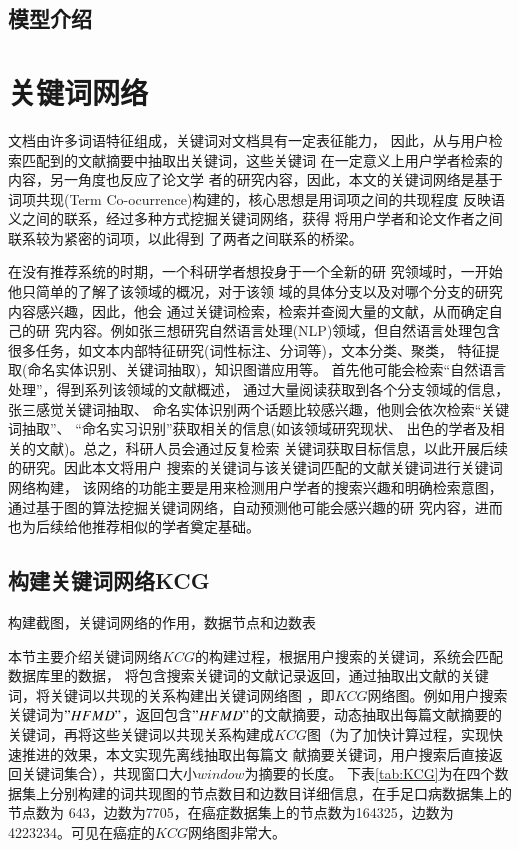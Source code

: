 \subsection{模型介绍}



\section{关键词网络}
文档由许多词语特征组成，关键词对文档具有一定表征能力，%
因此，从与用户检索匹配到的文献摘要中抽取出关键词，这些关键词%
在一定意义上用户学者检索的内容，另一角度也反应了论文学%
者的研究内容，因此，本文的关键词网络是基于词项共现(Term Co-ocurrence)构建的，核心思想是用词项之间的共现程度%
反映语义之间的联系，经过多种方式挖掘关键词网络，获得%
将用户学者和论文作者之间联系较为紧密的词项，以此得到%
了两者之间联系的桥梁。

在没有推荐系统的时期，一个科研学者想投身于一个全新的研%
究领域时，一开始他只简单的了解了该领域的概况，对于该领%
域的具体分支以及对哪个分支的研究内容感兴趣，因此，他会%
通过关键词检索，检索并查阅大量的文献，从而确定自己的研%
究内容。例如张三想研究自然语言处理(NLP)领域，但自然语言处理包含很多任务，如文本内部特征研究(词性标注、分词等)，文本分类、聚类，%
特征提取(命名实体识别、关键词抽取)，知识图谱应用等。%
首先他可能会检索“自然语言处理”，得到系列该领域的文献概述，%
通过大量阅读获取到各个分支领域的信息，张三感觉关键词抽取、%
命名实体识别两个话题比较感兴趣，他则会依次检索“关键词抽取”、%
“命名实习识别”获取相关的信息(如该领域研究现状、%
出色的学者及相关的文献)。总之，科研人员会通过反复检索%
关键词获取目标信息，以此开展后续的研究。因此本文将用户%
搜索的关键词与该关键词匹配的文献关键词进行关键词网络构建，%
该网络的功能主要是用来检测用户学者的搜索兴趣和明确检索意图，%
通过基于图的算法挖掘关键词网络，自动预测他可能会感兴趣的研%
究内容，进而也为后续给他推荐相似的学者奠定基础。

\subsection{构建关键词网络KCG}
构建截图，关键词网络的作用，数据节点和边数表%

本节主要介绍关键词网络$KCG$的构建过程，根据用户搜索的关键词，系统会匹配数据库里的数据，%
将包含搜索关键词的文献记录返回，通过抽取出文献的关键词，将关键词以共现的关系构建出关键词网络图%
，即$KCG$网络图。例如用户搜索关键词为$"HFMD"$，返回包含$"HFMD"$的文献摘要，动态抽取出每篇文献摘要的%
关键词，再将这些关键词以共现关系构建成$KCG$图（为了加快计算过程，实现快速推进的效果，本文实现先离线抽取出每篇文%
献摘要关键词，用户搜索后直接返回关键词集合），共现窗口大小$window$为摘要的长度。%
下表\ref{tab:KCG}为在四个数据集上分别构建的词共现图的节点数目和边数目详细信息，在手足口病数据集上的节点数为%
643，边数为7705，在癌症数据集上的节点数为164325，边数为4223234。可见在癌症的$KCG$网络图非常大。%



